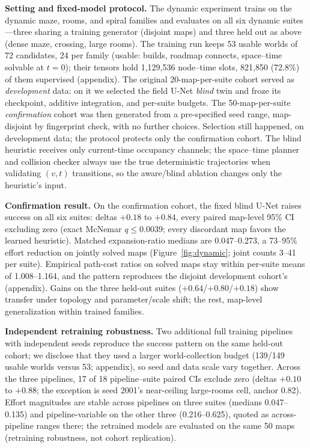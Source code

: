 \documentclass[letterpaper]{article} %
\begin{document}
\textbf{Setting and fixed-model protocol.} The dynamic experiment trains on the dynamic maze, rooms, and spiral families and evaluates on all six dynamic suites---three sharing a training generator (disjoint maps) and three held out as above (dense maze, crossing, large rooms). The training run keeps 53 usable worlds of 72 candidates, 24 per family (usable: builds, roadmap connects, space--time solvable at $t{=}0$); their tensors hold 1{,}129{,}536 node--time slots, 821{,}850 (72.8\%) of them supervised (appendix). The original 20-map-per-suite cohort served as \emph{development} data: on it we selected the field U-Net \emph{blind} twin and froze its checkpoint, additive integration, and per-suite budgets. The 50-map-per-suite \emph{confirmation} cohort was then generated from a pre-specified seed range, map-disjoint by fingerprint check, with no further choices. Selection still happened, on development data; the protocol protects only the confirmation cohort. The blind heuristic receives only current-time occupancy channels; the space--time planner and collision checker always use the true deterministic trajectories when validating $(v,t)$ transitions, so the aware/blind ablation changes only the heuristic's input.

\textbf{Confirmation result.} On the confirmation cohort, the fixed blind U-Net raises success on all six suites: deltas $+0.18$ to $+0.84$, every paired map-level 95\% CI excluding zero (exact McNemar $q \leq 0.0039$; every discordant map favors the learned heuristic). Matched expansion-ratio medians are 0.047--0.273, a 73--95\% effort reduction on jointly solved maps (Figure~\ref{fig:dynamic}; joint counts 3--41 per suite). Empirical path-cost ratios on solved maps stay within per-suite means of 1.008--1.164, and the pattern reproduces the disjoint development cohort's (appendix). Gains on the three held-out suites ($+0.64$/$+0.80$/$+0.18$) show transfer under topology and parameter/scale shift; the rest, map-level generalization within trained families.

\textbf{Independent retraining robustness.} Two additional full training pipelines with independent seeds reproduce the success pattern on the same held-out cohort; we disclose that they used a larger world-collection budget (139/149 usable worlds versus 53; appendix), so seed and data scale vary together. Across the three pipelines, 17 of 18 pipeline--suite paired CIs exclude zero (deltas $+0.10$ to $+0.88$; the exception is seed 2001's near-ceiling large-rooms cell, anchor 0.82). Effort magnitudes are stable across pipelines on three suites (medians 0.047--0.135) and pipeline-variable on the other three (0.216--0.625), quoted as across-pipeline ranges there; the retrained models are evaluated on the same 50 maps (retraining robustness, not cohort replication).
\end{document}
